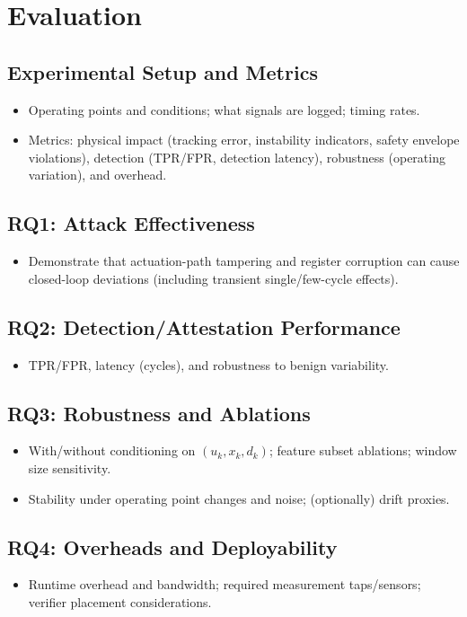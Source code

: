 \section{Evaluation}
\label{sec:evaluation}
\subsection{Experimental Setup and Metrics}
\begin{itemize}
    \item Operating points and conditions; what signals are logged; timing rates.
    \item Metrics: physical impact (tracking error, instability indicators, safety envelope violations), detection (TPR/FPR, detection latency), robustness (operating variation), and overhead.
\end{itemize}

\subsection{RQ1: Attack Effectiveness}
\begin{itemize}
    \item Demonstrate that actuation-path tampering and register corruption can cause closed-loop deviations (including transient single/few-cycle effects).
\end{itemize}

\subsection{RQ2: Detection/Attestation Performance}
\begin{itemize}
    \item TPR/FPR, latency (cycles), and robustness to benign variability.
\end{itemize}

\subsection{RQ3: Robustness and Ablations}
\begin{itemize}
    \item With/without conditioning on $(u_k,x_k,d_k)$; feature subset ablations; window size sensitivity.
    \item Stability under operating point changes and noise; (optionally) drift proxies.
\end{itemize}

\subsection{RQ4: Overheads and Deployability}
\begin{itemize}
    \item Runtime overhead and bandwidth; required measurement taps/sensors; verifier placement considerations.
\end{itemize}
